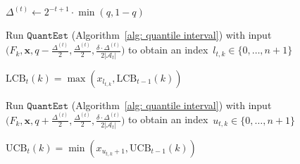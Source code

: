 \begin{algorithm}[!t]
\begin{algorithmic}[1]
        \label{line: start while loop}
        

           
            
            \State $\Delta^{(t)} \leftarrow 2^{-t+1} \cdot \min(q, 1-q)$
            \label{def: Delta_t}
            

                \State  
                \label{ltk def}
                \parbox[t]{\dimexpr\linewidth-3em}{%
          Run $\mathtt{QuantEst}$ (Algorithm~\ref{alg: quantile interval}) with input $\big(F_k, \mathbf{x}, q - \frac{\Delta^{(t)}}{2}, 
                \frac{\Delta^{(t)}}{2}, 
                \frac{\delta \cdot \Delta^{(t)}}{2 |\mathcal{A}_t|}\big)$
                to obtain an index~$l_{t, k} 
                 \in \{0, \dots, n+1\}$
        }
        
                
    
                \State
                \label{LCB definition}
                $\mathrm{LCB}_t(k) =
                \max
                \left(
                x_{l_{t, k}},
                \mathrm{LCB}_{t-1}(k)
                \right) 
                $
                
                \State
                \label{utk def}
                \parbox[t]{\dimexpr\linewidth-3em}{%
          Run $\mathtt{QuantEst}$ (Algorithm~\ref{alg: quantile interval}) with input $\big(F_k, \mathbf{x}, q + \frac{\Delta^{(t)}}{2}, 
                \frac{\Delta^{(t)}}{2}, 
                \frac{\delta \cdot \Delta^{(t)}}{2 |\mathcal{A}_t|}\big)$
                to obtain an index~$u_{t, k}  \in \{0, \dots, n+1\}$
        }
                
    
                \State
                $\mathrm{UCB}_t(k) =
                \min
                \left(
                x_{u_{t, k} + 1},
                \mathrm{UCB}_{t-1}(k)
                \right)$
                \label{UCB definition}
            \EndFor


\end{algorithmic}
\end{algorithm}
